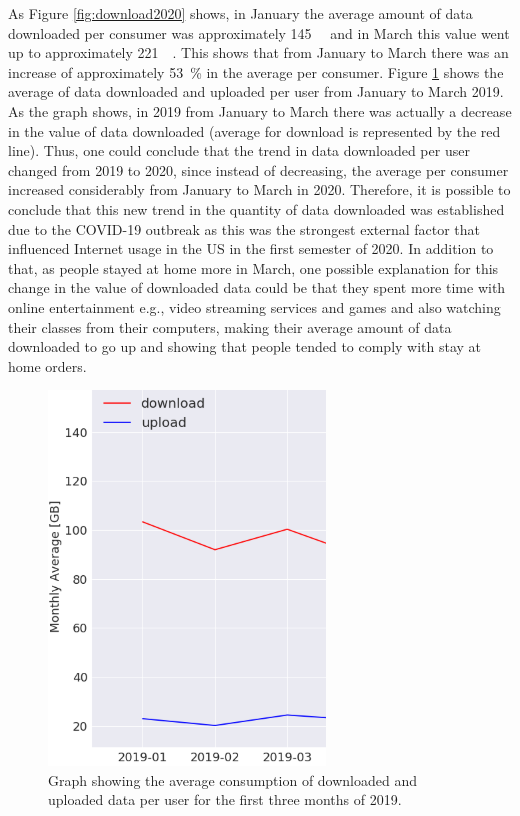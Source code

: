 \documentclass[conference]{IEEEtran}
\begin{document}
As Figure \ref{fig:download2020} shows, in January the average amount of data downloaded per consumer was approximately \SI{145}{\giga\byte} and in March this value went up to approximately \SI{221}{\giga\byte}. This shows that from January to March there was an increase of approximately \SI{53}{\percent} in the average per consumer. Figure \ref{fig:downloadup2019} shows the average of data downloaded and uploaded per user from January to March 2019. As the graph shows, in 2019 from January to March there was actually a decrease in the value of data downloaded (average for download is represented by the red line). Thus, one could conclude that the trend in data downloaded per user changed from 2019 to 2020, since instead of decreasing, the average per consumer increased considerably from January to March in 2020. Therefore, it is possible to conclude that this new trend in the quantity of data downloaded was established due to the COVID-19 outbreak as this was the strongest external factor that influenced  Internet usage in the US in the first semester of 2020. In addition to that, as people stayed at home more in March, one possible explanation for this change in the value of downloaded data could be that they spent more time with online entertainment e.g., video streaming services and games and also watching their classes from their computers, making their average amount of data downloaded to go up and showing that people tended to comply with stay at home orders.  

\begin{figure}[h!]
\centering
\includegraphics[width=0.5\linewidth]{downloadup2019.PNG}
\caption{Graph showing the average consumption of downloaded and uploaded data per user for the first three months of 2019.}
\label{fig:downloadup2019}
\end{figure}
\end{document}

